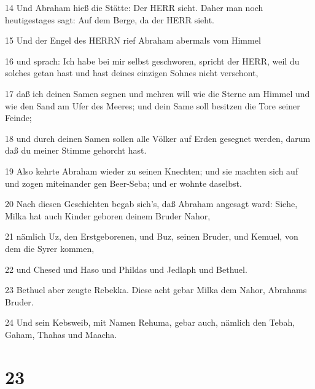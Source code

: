 \par 14 Und Abraham hieß die Stätte: Der HERR sieht. Daher man noch heutigestages sagt: Auf dem Berge, da der HERR sieht.
\par 15 Und der Engel des HERRN rief Abraham abermals vom Himmel
\par 16 und sprach: Ich habe bei mir selbst geschworen, spricht der HERR, weil du solches getan hast und hast deines einzigen Sohnes nicht verschont,
\par 17 daß ich deinen Samen segnen und mehren will wie die Sterne am Himmel und wie den Sand am Ufer des Meeres; und dein Same soll besitzen die Tore seiner Feinde;
\par 18 und durch deinen Samen sollen alle Völker auf Erden gesegnet werden, darum daß du meiner Stimme gehorcht hast.
\par 19 Also kehrte Abraham wieder zu seinen Knechten; und sie machten sich auf und zogen miteinander gen Beer-Seba; und er wohnte daselbst.
\par 20 Nach diesen Geschichten begab sich's, daß Abraham angesagt ward: Siehe, Milka hat auch Kinder geboren deinem Bruder Nahor,
\par 21 nämlich Uz, den Erstgeborenen, und Buz, seinen Bruder, und Kemuel, von dem die Syrer kommen,
\par 22 und Chesed und Haso und Phildas und Jedlaph und Bethuel.
\par 23 Bethuel aber zeugte Rebekka. Diese acht gebar Milka dem Nahor, Abrahams Bruder.
\par 24 Und sein Kebsweib, mit Namen Rehuma, gebar auch, nämlich den Tebah, Gaham, Thahas und Maacha.

\chapter{23}

